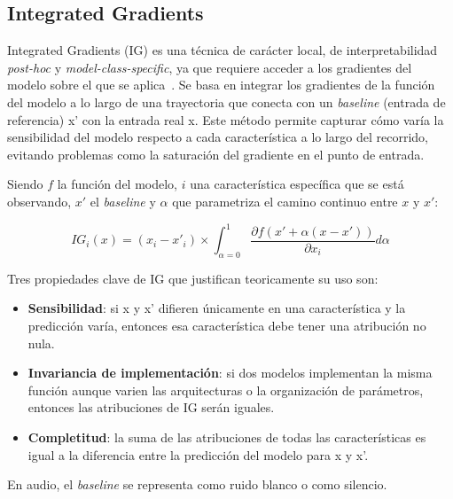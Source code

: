 \subsection{Integrated Gradients}
\label{subsubsec:eda_ig}

Integrated Gradients (IG) es una técnica de carácter local, de interpretabilidad \textit{post-hoc} y \textit{model-class-specific}, ya que requiere acceder a los gradientes del modelo sobre el que se aplica~\parencite{2017integratedgradients}. Se basa en integrar los gradientes de la función del modelo a lo largo de una trayectoria que conecta con un \textit{baseline} (entrada de referencia) x' con la entrada real x. Este método permite capturar cómo varía la sensibilidad del modelo respecto a cada característica a lo largo del recorrido, evitando problemas como la saturación del gradiente en el punto de entrada.

Siendo $f$ la función del modelo, $i$ una característica específica que se está observando, $x'$ el \textit{baseline} y $\alpha$ que parametriza el camino continuo entre $x$ y $x'$:

$$ IG_i(x) = (x_i - x'_i) \times \int_{\alpha=0}^{1} \frac{\partial f(x' + \alpha(x - x'))}{\partial x_i} d\alpha $$

Tres propiedades clave de IG que justifican teoricamente su uso son:
\begin{itemize}
            \item \textbf{Sensibilidad}: si x y x' difieren únicamente en una característica y la predicción varía, entonces esa característica debe tener una atribución no nula.
            \item \textbf{Invariancia de implementación}: si dos modelos implementan la misma función aunque varien las arquitecturas o la organización de parámetros, entonces las atribuciones de IG serán iguales.
            \item \textbf{Completitud}: la suma de las atribuciones de todas las características es igual a la diferencia entre la predicción del modelo para x y x'.
\end{itemize}
En audio, el \textit{baseline} se representa como ruido blanco o como silencio.